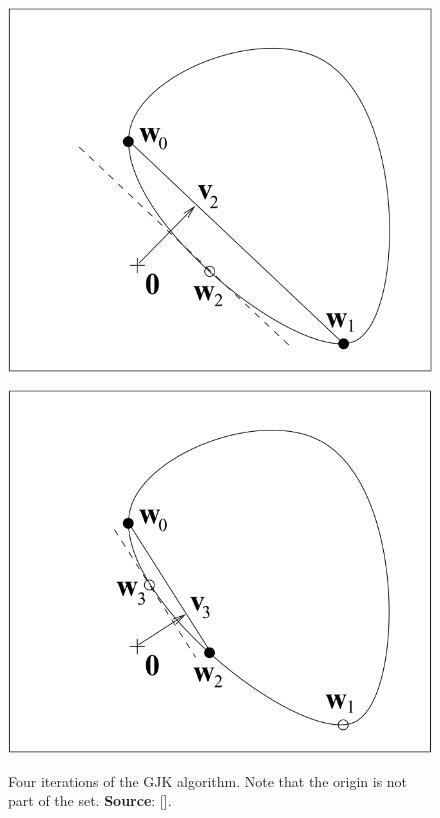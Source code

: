 \begin{figure}[h]
\begin{minipage}[h]{0.3\textwidth}
		\label{fig:GJK2}
	\end{minipage}
	\begin{minipage}[h]{0.3\textwidth}
		\includegraphics[width=1\textwidth]{import/GJK_3.png}
		\label{fig:GJK3}
	\end{minipage}
	\hspace{1cm}
	\begin{minipage}[h]{0.3\textwidth}
		\includegraphics[width=1\textwidth]{import/GJK_4.png}
		\label{fig:GJK4}
	\end{minipage}
	\caption{Four iterations of the GJK algorithm. Note that the origin is not part of the set. \textbf{Source}: [\citeauthor{VanDenBergen1999}].}
	\label{fig:GJK_Algo}
\end{figure}

